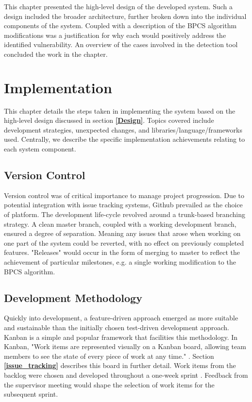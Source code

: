 \documentclass{l4proj}
\begin{document}
This chapter presented the high-level design of the developed system. Such a design included the broader architecture, further broken down into the individual components of the system. Coupled with a description of the BPCS algorithm modifications was a justification for why each would positively address the identified vulnerability. An overview of the cases involved in the detection tool concluded the work in the chapter.

\chapter{Implementation}\label{Implementation}

This chapter details the steps taken in implementing the system based on the high-level design discussed in section \textbf{\ref{Design}}. Topics covered include development strategies, unexpected changes, and libraries/language/frameworks used. Centrally, we describe the specific implementation achievements relating to each system component.

\section{Version Control}

Version control \citep{version_control} was of critical importance to manage project progression. Due to potential integration with issue tracking systems, Github prevailed as the choice of platform. The development life-cycle revolved around a trunk-based branching strategy. A clean master branch, coupled with a working development branch, ensured a degree of separation. Meaning any issues that arose when working on one part of the system could be reverted, with no effect on previously completed features. "Releases" would occur in the form of merging to master to reflect the achievement of particular milestones, e.g. a single working modification to the BPCS algorithm.

\section{Development Methodology}\label{development_methodology}

Quickly into development, a feature-driven approach emerged as more suitable and sustainable than the initially chosen test-driven development approach. Kanban is a simple and popular framework that facilities this methodology. In Kanban, "Work items are represented visually on a Kanban board, allowing team members to see the state of every piece of work at any time." \citep{kanban}. Section \textbf{\ref{issue_tracking}} describes this board in further detail. Work items from the backlog were chosen and developed throughout a one-week sprint \citep{sprints}. Feedback from the supervisor meeting would shape the selection of work items for the subsequent sprint.
\end{document}
